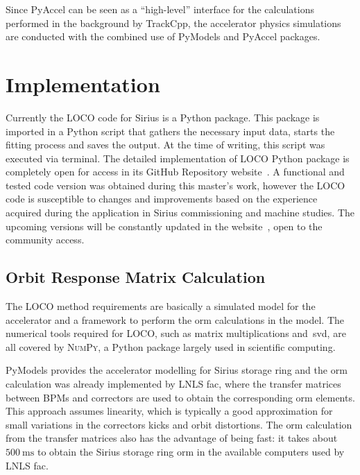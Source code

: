 Since PyAccel can be seen as a ``high-level'' interface for the calculations performed in the background by TrackCpp, the accelerator physics simulations are conducted with the combined use of PyModels and PyAccel packages.
\section{Implementation}
Currently the LOCO code for Sirius is a Python package. This package is imported in a Python script that gathers the necessary input data, starts the fitting process and saves the output. At the time of writing, this script was executed via terminal. The detailed implementation of LOCO Python package is completely open for access in its GitHub Repository website~\cite{locosirius}. A functional and tested code version was obtained during this master's work, however the LOCO code is susceptible to changes and improvements based on the experience acquired during the application in Sirius commissioning and machine studies. The upcoming versions will be constantly updated in the website~\cite{locosirius}, open to the community access.

\subsection{Orbit Response Matrix Calculation}
The LOCO method requirements are basically a simulated model for the accelerator and a framework to perform the \gls{orm} calculations in the model. The numerical tools required for LOCO, such as matrix multiplications and~\gls{svd}, are all covered by \textsc{NumPy}, a Python package largely used in scientific computing. 

PyModels provides the accelerator modelling for Sirius storage ring and the \gls{orm} calculation was already implemented by LNLS \gls{fac}, where the transfer matrices between BPMs and correctors are used to obtain the corresponding \gls{orm} elements. This approach assumes linearity, which is typically a good approximation for small variations in the correctors kicks and orbit distortions. The \gls{orm} calculation from the transfer matrices also has the advantage of being fast: it takes about $\SI{500}{\milli\second}$ to obtain the Sirius storage ring \gls{orm} in the available computers used by LNLS \gls{fac}.

